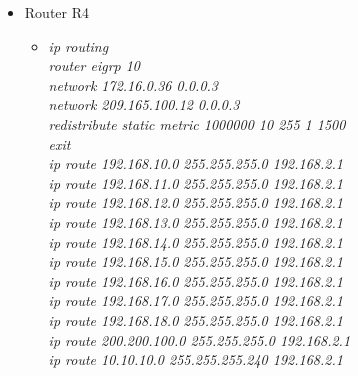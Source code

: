 \documentclass[12pt,a4paper]{report}
\begin{document}
\begin{itemize}
\begin{itemize}
\begin{itemize}
          \end{itemize}
             \item Router R4
        \begin{itemize}
         \item \textit{ip routing\\
router eigrp 10\\
network 172.16.0.36 0.0.0.3\\
network 209.165.100.12 0.0.0.3\\
redistribute static metric 1000000 10 255 1 1500\\
exit\\
ip route 192.168.10.0 255.255.255.0 192.168.2.1\\
ip route 192.168.11.0 255.255.255.0 192.168.2.1\\
ip route 192.168.12.0 255.255.255.0 192.168.2.1\\
ip route 192.168.13.0 255.255.255.0 192.168.2.1\\
ip route 192.168.14.0 255.255.255.0 192.168.2.1\\
ip route 192.168.15.0 255.255.255.0 192.168.2.1\\
ip route 192.168.16.0 255.255.255.0 192.168.2.1\\
ip route 192.168.17.0 255.255.255.0 192.168.2.1\\
ip route 192.168.18.0 255.255.255.0 192.168.2.1\\
ip route 200.200.100.0 255.255.255.0 192.168.2.1\\
ip route 10.10.10.0 255.255.255.240 192.168.2.1\\}


\end{itemize}
\end{itemize}
\end{itemize}
\end{document}
